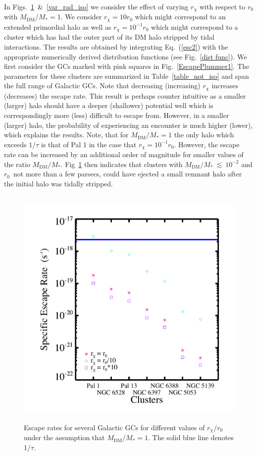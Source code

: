 \documentclass[aps,floatfix,prd,showpacs]{revtex4}
\newcommand{\rx}{r_\chi}
\newcommand{\MDM}{M_{\mathrm{DM}}}
\begin{document}
In Figs.~\ref{var_rad_not_iso}~\&~\ref{var_rad_iso} we consider the effect of varying $\rx$ with respect to $r_0$ with $\MDM/M_* = 1$.  We consider $\rx = 10r_0$ which might correspond to an extended primordial halo as well as $\rx = 10^{-1}r_0$ which might correspond to a cluster which has had the outer part of its DM halo stripped by tidal interactions.  The results are obtained by integrating Eq.~(\ref{esc2}) with the appropriate numerically derived distribution functions (see Fig.~\ref{dist func}).  We first consider the GCs marked with pink squares in Fig.~\ref{EscapePlummer1}.  The parameters for these clusters are summarized in Table~\ref{table_not_iso} and span the full range of Galactic GCs.  Note that decreasing (increasing) $\rx$ increases (decreases) the escape rate.  This result is perhaps counter intuitive as a smaller (larger) halo should have a deeper (shallower) potential well which is correspondingly more (less) difficult to escape from.  However, in a smaller (larger) halo, the probability of experiencing an encounter is much higher (lower), which explains the results.  Note, that for $\MDM/M_* = 1$ the only halo which exceeds $1/\tau$ is that of Pal 1 in the case that $\rx = 10^{-1}r_0$.  However, the escape rate can be increased by an additional order of magnitude for smaller values of the ratio $\MDM/M_*$.  Fig~\ref{var_rad_not_iso} then indicates that clusters with $\MDM/M_*~\lesssim~10^{-2}$ and $r_0$~not more than a few parsecs, could have ejected a small remnant halo after the initial halo was tidally stripped.  
%
\begin{figure}[htp]
\centering
\includegraphics[width=12cm, height=12cm]{var_rad_not_iso}
\caption{Escape rates for several Galactic GCs for different values of $\rx/r_0$ under the assumption that $\MDM/M_* = 1$.  The solid blue line denotes $1/\tau$.}  
\label{var_rad_not_iso}
\end{figure}
\end{document}
